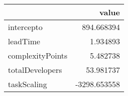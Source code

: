 \begin{tabular}{lr}
\toprule
{} &        value \\
\midrule
intercepto       &   894.668394 \\
leadTime         &     1.934893 \\
complexityPoints &     5.482738 \\
totalDevelopers  &    53.981737 \\
taskScaling      & -3298.653558 \\
\bottomrule
\end{tabular}
